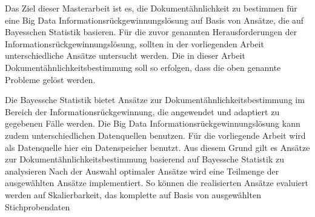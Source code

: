              

            


Das Ziel dieser Masterarbeit ist es, die Dokumentähnlichkeit zu bestimmen für eine Big Data Informationsrückgewinnungslösung auf Basis von Ansätze, die auf Bayesschen Statistik basieren. Für die zuvor genannten Herausforderungen der Informationsrückgewinnungslösung, sollten in der vorliegenden Arbeit unterschiedliche Ansätze untersucht werden.  Die in dieser Arbeit Dokumentähnlichkeitsbestimmung soll so erfolgen, dass die oben genannte Probleme gelöst werden. 

Die Bayessche Statistik bietet Ansätze zur Dokumentähnlichkeitsbestimmung im Bereich der Informationsrückgewinnung, die angewendet und adaptiert zu gegebenen Fälle werden. Die Big Data Informationsrückgewinnungslösung kann zudem unterschiedlichen Datenquellen benutzen. Für die vorliegende Arbeit wird als Datenquelle hier ein Datenspeicher benutzt. Aus diesem Grund gilt es Ansätze zur Dokumentähnlichkeitsbestimmung basierend auf Bayessche Statistik zu analysieren Nach der Auswahl optimaler Ansätze wird eine Teilmenge der ausgewählten Ansätze implementiert. So können die realisierten Ansätze evaluiert werden auf Skalierbarkeit, das komplette auf Basis von ausgewählten Stichprobendaten
